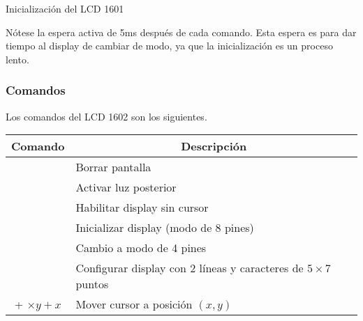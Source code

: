 \begin{algorithm}[H]
	\centering
	\caption{Inicialización del LCD 1601}%
	\label{tbl:lcd-init}
	\begin{algorithmic}
			\State {}
			\State {}

			\State {}
			\State {}

			\State {}
			\State {}

			\State {}
			\State {}

			\State {}
			\State {}
		\EndProcedure{}
	\end{algorithmic}
\end{algorithm}
\medskip

Nótese la espera activa de 5ms después de cada comando. Esta espera es para dar tiempo al display de cambiar de modo, ya que la inicialización es un proceso lento.

\subsubsection{Comandos}
Los comandos del LCD 1602 son los siguientes.

\begin{tabularx}{0.9\linewidth}{c X}
	\toprule
	\multicolumn{1}{c}{\bfseries Comando} &
	\multicolumn{1}{c}{\bfseries Descripción} \\
	\midrule
	\hex{01} & Borrar pantalla \\
	\hex{08} & Activar luz posterior \\
	\hex{0C} & Habilitar display sin cursor \\
	\hex{33} & Inicializar display (modo de 8 pines) \\
	\hex{32} & Cambio a modo de 4 pines \\
	\hex{32} & Configurar display con 2 líneas y caracteres de $5\times7$ puntos \\
	\hex{80} + \hex{40}$\times y + x$
	         & Mover cursor a posición $(x, y)$\\
	\bottomrule
\end{tabularx}
